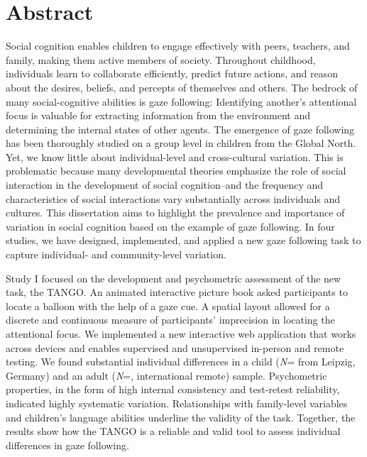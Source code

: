 \documentclass[
]{scrbook}
\begin{document}
\chapter{Abstract}\label{abstract}

Social cognition enables children to engage effectively with peers, teachers, and family, making them active members of society. Throughout childhood, individuals learn to collaborate efficiently, predict future actions, and reason about the desires, beliefs, and percepts of themselves and others. The bedrock of many social-cognitive abilities is gaze following: Identifying another's attentional focus is valuable for extracting information from the environment and determining the internal states of other agents. The emergence of gaze following has been thoroughly studied on a group level in children from the Global North. Yet, we know little about individual-level and cross-cultural variation. This is problematic because many developmental theories emphasize the role of social interaction in the development of social cognition\thinspace --\thinspace and the frequency and characteristics of social interactions vary substantially across individuals and cultures. This dissertation aims to highlight the prevalence and importance of variation in social cognition based on the example of gaze following. In four studies, we have designed, implemented, and applied a new gaze following task to capture individual- and community-level variation.

Study I focused on the development and psychometric assessment of the new task, the TANGO. An animated interactive picture book asked participants to locate a balloon with the help of a gaze cue. A spatial layout allowed for a discrete and continuous measure of participants' imprecision in locating the attentional focus. We implemented a new interactive web application that works across devices and enables supervised and unsupervised in-person and remote testing. We found substantial individual differences in a child (\emph{N}\thinspace= from Leipzig, Germany) and an adult (\emph{N}\thinspace =, international remote) sample. Psychometric properties, in the form of high internal consistency and test-retest reliability, indicated highly systematic variation. Relationships with family-level variables and children's language abilities underline the validity of the task. Together, the results show how the TANGO is a reliable and valid tool to assess individual differences in gaze following.
\end{document}
